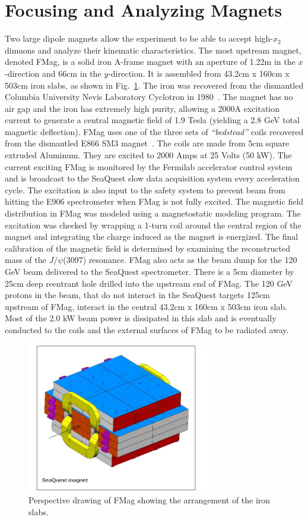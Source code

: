 \section{Focusing and Analyzing Magnets}

Two large dipole magnets allow the experiment to be able to accept high-$x_2$ dimuons and analyze their kinematic characteristics. The most upstream magnet, denoted FMag, is a solid iron A-frame magnet with an aperture of 1.22m in the $x$-direction and 66cm in the $y$-direction. It is assembled from 43.2cm x 160cm x 503cm iron slabs, as shown in Fig.~\ref{fig:FMag}. The iron was recovered from the dismantled Columbia University Nevis Laboratory Cyclotron in 1980~\cite{NevisCyclotron}. The magnet has no air gap and the iron has extremely high purity, allowing a 2000A excitation current to generate a central magnetic field of 1.9 Tesla (yielding a 2.8 GeV total magnetic deflection). FMag uses one of the three sets of \emph{``bedstead''} coils recovered from the dismantled E866 SM3 magnet~\cite{PhysRevD.43.2815, PhysRevLett.64.2479, PhysRevLett.80.3715, Towell:2001nh}.  The coils are made from 5cm square extruded Aluminum.  They are excited to 2000 Amps at 25 Volts (50 kW).  The current exciting FMag is monitored by the Fermilab accelerator control system and is broadcast to the SeaQuest slow data acquisition system every acceleration cycle. The excitation is also input to the safety system to prevent beam from hitting the E906 spectrometer when FMag is not fully excited. The magnetic field distribution in FMag was modeled using a magnetostatic modeling program.  The excitation was checked by wrapping a 1-turn coil around the central region of the magnet and integrating the charge induced as the magnet is energized. The final calibration of the magnetic field is determined by examining the reconstructed mass of the $J/\psi$(3097) resonance. FMag also acts as the beam dump for the 120 GeV beam delivered to the SeaQuest spectrometer.  There is a 5cm diameter by 25cm deep reentrant hole drilled into the upstream end of FMag.  The 120 GeV protons in the beam, that do not interact in the SeaQuest targets 125cm upstream of FMag, interact in the central  43.2cm x 160cm x 503cm iron slab.  Most of the 2.0 kW beam power is dissipated in this slab and is eventually conducted to the coils and the external surfaces of FMag to be radiated away.

\begin{figure}
	\centering
	\includegraphics[width=8cm]{figures/FMAG}
	\caption{Perspective drawing of FMag showing the arrangement of the iron slabs. \label{fig:FMag}}
\end{figure}

